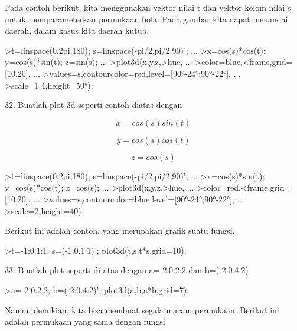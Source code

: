 \documentclass[a4paper,10pt]{article}
\begin{document}
\begin{eulernotebook}
\begin{eulercomment}
Pada contoh berikut, kita menggunakan vektor nilai t dan vektor kolom
nilai s untuk memparameterkan permukaan bola. Pada gambar kita dapat
menandai daerah, dalam kasus kita daerah kutub.
\end{eulercomment}
\begin{eulerprompt}
>t=linspace(0,2pi,180); s=linspace(-pi/2,pi/2,90)'; ...
>x=cos(s)*cos(t); y=cos(s)*sin(t); z=sin(s); ...
>plot3d(x,y,z,>hue, ...
>color=blue,<frame,grid=[10,20], ...
>values=s,contourcolor=red,level=[90°-24°;90°-22°], ...
>scale=1.4,height=50°):
\end{eulerprompt}
\begin{eulercomment}
32. Buatlah plot 3d seperti contoh diatas dengan\\
\end{eulercomment}
\begin{eulerformula}
\[
x=cos(s)sin(t)
\]
\end{eulerformula}
\begin{eulerformula}
\[
y=cos(s)cos(t)
\]
\end{eulerformula}
\begin{eulerformula}
\[
z=cos(s)
\]
\end{eulerformula}
\begin{eulerprompt}
>t=linspace(0,2pi,180); s=linspace(-pi/2,pi/2,90)'; ...
>x=cos(s)*sin(t); y=cos(s)*cos(t); z=cos(s); ...
>plot3d(x,y,z,>hue, ...
>color=red,<frame,grid=[10,20], ...
>values=s,contourcolor=blue,level=[90°-24°;90°-22°], ...
>scale=2,height=40): 
\end{eulerprompt}
\begin{eulercomment}
Berikut ini adalah contoh, yang merupakan grafik suatu fungsi.
\end{eulercomment}
\begin{eulerprompt}
>t=-1:0.1:1; s=(-1:0.1:1)'; plot3d(t,s,t*s,grid=10):
\end{eulerprompt}
\begin{eulercomment}
33. Buatlah plot seperti di atas dengan a=-2:0.2:2 dan b=(-2:0.4:2)
\end{eulercomment}
\begin{eulerprompt}
>a=-2:0.2:2; b=(-2:0.4:2)'; plot3d(a,b,a*b,grid=7):
\end{eulerprompt}
\begin{eulercomment}
Namun demikian, kita bisa membuat segala macam permukaan. Berikut ini
adalah permukaan yang sama dengan fungsi


\end{eulercomment}
\end{eulernotebook}
\end{document}
